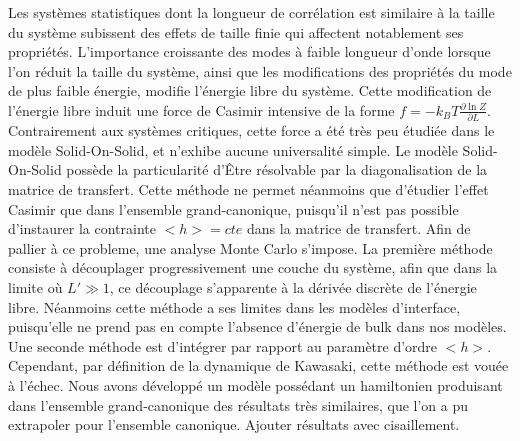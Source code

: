 Les systèmes statistiques dont la longueur de corrélation est similaire à la taille du système subissent des effets de taille finie qui affectent notablement ses propriétés. L'importance croissante des modes à faible longueur d'onde lorsque l'on réduit la taille du système, ainsi que les modifications des propriétés du mode de plus faible énergie, modifie l'énergie libre du système. Cette modification de l'énergie libre induit une force de Casimir intensive de la forme $f = -k_B T \frac{\partial \ln Z}{\partial L}$. Contrairement aux systèmes critiques, cette force a été très peu étudiée dans le modèle Solid-On-Solid, et n'exhibe aucune universalité simple. Le modèle Solid-On-Solid possède la particularité d'Être résolvable par la diagonalisation de la matrice de transfert. Cette méthode ne permet néanmoins que d'étudier l'effet Casimir que dans l'ensemble grand-canonique, puisqu'il n'est pas possible d'instaurer la contrainte $<h>=cte$ dans la matrice de transfert. 
Afin de pallier à ce probleme, une analyse Monte Carlo s'impose. La première méthode consiste à découplager progressivement une couche du système, afin que dans la limite où $L' \gg 1$, ce découplage s'apparente à la dérivée discrète de l'énergie libre. Néanmoins cette méthode a ses limites dans les modèles d'interface, puisqu'elle ne prend pas en compte l'absence d'énergie de bulk dans nos modèles. 
Une seconde méthode est d'intégrer par rapport au paramètre d'ordre $<h>$. Cependant, par définition de la dynamique de Kawasaki, cette méthode est vouée à l'échec. Nous avons développé un modèle possédant un hamiltonien produisant dans l'ensemble grand-canonique des résultats très similaires, que l'on a pu extrapoler pour l'ensemble canonique. 
{\color{red} Ajouter résultats avec cisaillement.}